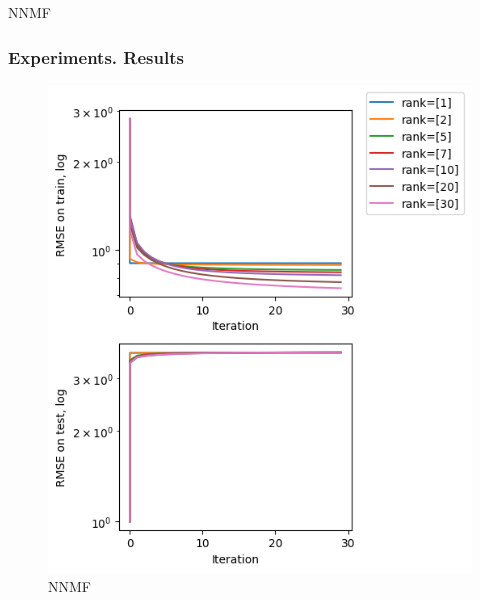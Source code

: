 \documentclass[pdf,10pt]{beamer}
\begin{document}
\begin{section}{NNMF}
 \begin{frame}
   \frametitle{Experiments. Results}
   \begin{figure}[H]
     \centering
     \includegraphics[keepaspectratio, scale=0.4]{../data/nnmf.png}
     \caption[NNMF]{NNMF}\label{fig:nnmf}
   \end{figure}
 \end{frame}

\end{section}
\end{document}
